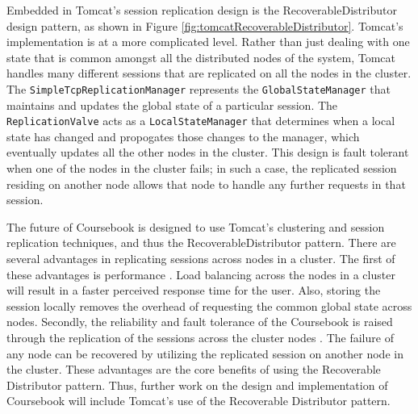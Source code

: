 Embedded in Tomcat's session replication design is the RecoverableDistributor
design pattern, as shown in Figure \ref{fig:tomcatRecoverableDistributor}.
Tomcat's implementation is at a more complicated level. Rather than just dealing
with one state that is common amongst all the distributed nodes of the system,
Tomcat handles many different sessions that are replicated on all the nodes in
the cluster. The \texttt{SimpleTcpReplicationManager} represents the
\texttt{GlobalStateManager} that maintains and updates the global state of a
particular session. The \texttt{ReplicationValve} acts as a 
\texttt{LocalStateManager} that determines when a local state has changed and
propogates those changes to the manager, which eventually updates all the other
nodes in the cluster. This design is fault tolerant when one of the nodes in the
cluster fails; in such a case, the replicated session residing on another node
allows that node to handle any further requests in that session.

The future of Coursebook is designed to use Tomcat's clustering and session
replication techniques, and thus the RecoverableDistributor pattern. There are
several advantages in replicating sessions across nodes in a cluster. The first
of these advantages is performance \cite{Tomcat}. Load balancing across the
nodes in a cluster will result in a faster perceived response time for the user.
Also, storing the session locally removes the overhead of requesting the common
global state across nodes. Secondly, the reliability and fault tolerance of the
Coursebook is raised through the replication of the sessions across the cluster
nodes \cite{Tomcat}. The failure of any node can be recovered by utilizing the
replicated session on another node in the cluster. These advantages are the core
benefits of using the Recoverable Distributor pattern. Thus, further work on the
design and implementation of Coursebook will include Tomcat's use of the 
Recoverable Distributor pattern.
